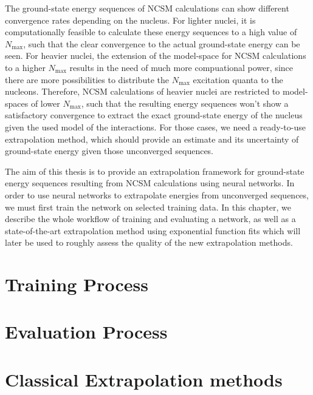 The ground-state energy sequences of NCSM calculations can show different convergence rates depending on the nucleus. For lighter nuclei, it is computationally feasible to calculate these energy sequences to a high value of $N_\mathrm{max}$, such that the clear convergence to the actual ground-state energy can be seen. For heavier nuclei, the extension of the model-space for NCSM calculations to a higher $N_\mathrm{max}$ results in the need of much more compuational power, since there are more possibilities to distribute the $N_\mathrm{max}$ excitation quanta to the nucleons. Therefore, NCSM calculations of heavier nuclei are restricted to model-spaces of lower $N_\mathrm{max}$, such that the resulting energy sequences won't show a satisfactory convergence to extract the exact ground-state energy of the nucleus given the used model of the interactions. For those cases, we need a ready-to-use extrapolation method, which should provide an estimate and its uncertainty of ground-state energy given those unconverged sequences.

The aim of this thesis is to provide an extrapolation framework for ground-state energy sequences resulting from NCSM calculations using neural networks. In order to use neural networks to extrapolate energies from unconverged sequences, we must first train the network on selected training data. In this chapter, we describe the whole workflow of training and evaluating a network, as well as a state-of-the-art extrapolation method using exponential function fits which will later be used to roughly assess the quality of the new extrapolation methods.

\section{Training Process}

\section{Evaluation Process}

\section{Classical Extrapolation methods}

